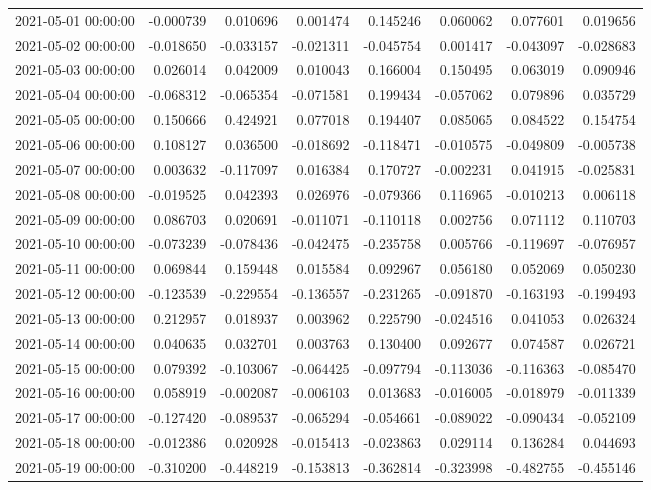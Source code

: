 \begin{tabular}{lrrrrrrr}
2021-05-01 00:00:00 & -0.000739 & 0.010696 & 0.001474 & 0.145246 & 0.060062 & 0.077601 & 0.019656 \\
2021-05-02 00:00:00 & -0.018650 & -0.033157 & -0.021311 & -0.045754 & 0.001417 & -0.043097 & -0.028683 \\
2021-05-03 00:00:00 & 0.026014 & 0.042009 & 0.010043 & 0.166004 & 0.150495 & 0.063019 & 0.090946 \\
2021-05-04 00:00:00 & -0.068312 & -0.065354 & -0.071581 & 0.199434 & -0.057062 & 0.079896 & 0.035729 \\
2021-05-05 00:00:00 & 0.150666 & 0.424921 & 0.077018 & 0.194407 & 0.085065 & 0.084522 & 0.154754 \\
2021-05-06 00:00:00 & 0.108127 & 0.036500 & -0.018692 & -0.118471 & -0.010575 & -0.049809 & -0.005738 \\
2021-05-07 00:00:00 & 0.003632 & -0.117097 & 0.016384 & 0.170727 & -0.002231 & 0.041915 & -0.025831 \\
2021-05-08 00:00:00 & -0.019525 & 0.042393 & 0.026976 & -0.079366 & 0.116965 & -0.010213 & 0.006118 \\
2021-05-09 00:00:00 & 0.086703 & 0.020691 & -0.011071 & -0.110118 & 0.002756 & 0.071112 & 0.110703 \\
2021-05-10 00:00:00 & -0.073239 & -0.078436 & -0.042475 & -0.235758 & 0.005766 & -0.119697 & -0.076957 \\
2021-05-11 00:00:00 & 0.069844 & 0.159448 & 0.015584 & 0.092967 & 0.056180 & 0.052069 & 0.050230 \\
2021-05-12 00:00:00 & -0.123539 & -0.229554 & -0.136557 & -0.231265 & -0.091870 & -0.163193 & -0.199493 \\
2021-05-13 00:00:00 & 0.212957 & 0.018937 & 0.003962 & 0.225790 & -0.024516 & 0.041053 & 0.026324 \\
2021-05-14 00:00:00 & 0.040635 & 0.032701 & 0.003763 & 0.130400 & 0.092677 & 0.074587 & 0.026721 \\
2021-05-15 00:00:00 & 0.079392 & -0.103067 & -0.064425 & -0.097794 & -0.113036 & -0.116363 & -0.085470 \\
2021-05-16 00:00:00 & 0.058919 & -0.002087 & -0.006103 & 0.013683 & -0.016005 & -0.018979 & -0.011339 \\
2021-05-17 00:00:00 & -0.127420 & -0.089537 & -0.065294 & -0.054661 & -0.089022 & -0.090434 & -0.052109 \\
2021-05-18 00:00:00 & -0.012386 & 0.020928 & -0.015413 & -0.023863 & 0.029114 & 0.136284 & 0.044693 \\
2021-05-19 00:00:00 & -0.310200 & -0.448219 & -0.153813 & -0.362814 & -0.323998 & -0.482755 & -0.455146 \\

\end{tabular}

